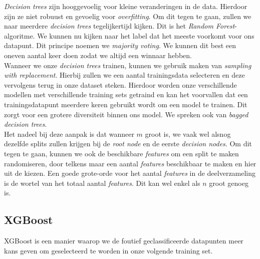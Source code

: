 \textit{Decision trees} zijn hooggevoelig voor kleine veranderingen in de data. Hierdoor zijn ze niet robuust en gevoelig voor \textit{overfitting}. Om dit tegen te gaan, zullen we naar meerdere \textit{decision trees} tegelijkertijd kijken. Dit is het \textit{Random Forest}-algoritme. We kunnen nu kijken naar het label dat het meeste voorkomt voor ons datapunt. Dit principe noemen we \textit{majority voting}. We kunnen dit best een oneven aantal keer doen zodat we altijd een winnaar hebben. \\
\newline
Wanneer we onze \textit{decision trees} trainen, kunnen we gebruik maken van \textit{sampling with replacement}. Hierbij zullen we een aantal trainingsdata selecteren en deze vervolgens terug in onze dataset steken. Hierdoor worden onze verschillende modellen met verschillende training sets getraind en kan het voorvallen dat een trainingsdatapunt meerdere keren gebruikt wordt om een model te trainen. Dit zorgt voor een grotere diversiteit binnen ons model. We spreken ook van \textit{bagged decision trees}. \\
\newline
Het nadeel bij deze aanpak is dat wanneer $m$ groot is, we vaak wel alsnog dezelfde splits zullen krijgen bij de \textit{root node} en de eerste \textit{decision nodes}. Om dit tegen te gaan, kunnen we ook de beschikbare \textit{features} om een split te maken randomiseren, door telkens maar een aantal \textit{features} beschikbaar te maken en hier uit de kiezen. Een goede grote-orde voor het aantal \textit{features} in de deelverzameling is de wortel van het totaal aantal \textit{features}. Dit kan wel enkel als $n$ groot genoeg is.

\subsection{XGBoost}

XGBoost is een manier waarop we de foutief geclassificeerde datapunten meer kans geven om geselecteerd te worden in onze volgende training set. 